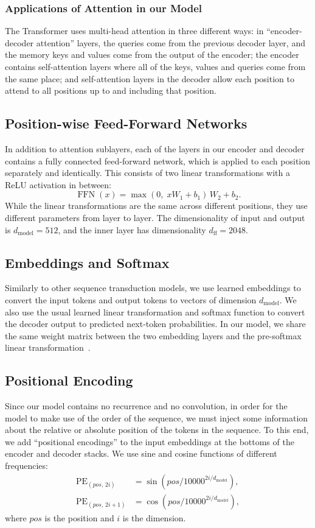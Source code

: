 \documentclass[10pt,letterpaper]{article}
\DeclareMathOperator{\FFN}{FFN}
\DeclareMathOperator{\PE}{PE}
\newcommand{\dmodel}{d_{\mathrm{model}}}
\newcommand{\dff}{d_{\mathrm{ff}}}
\begin{document}
\subsubsection{Applications of Attention in our Model}
The Transformer uses multi-head attention in three different ways: in
``encoder-decoder attention'' layers, the queries come from the previous decoder
layer, and the memory keys and values come from the output of the encoder; the
encoder contains self-attention layers where all of the keys, values and queries
come from the same place; and self-attention layers in the decoder allow each
position to attend to all positions up to and including that position.

\subsection{Position-wise Feed-Forward Networks}
In addition to attention sublayers, each of the layers in our encoder and decoder
contains a fully connected feed-forward network, which is applied to each position
separately and identically. This consists of two linear transformations with a
ReLU activation in between:
\begin{equation}
  \FFN(x) = \max(0,\; xW_1 + b_1)\,W_2 + b_2 .
  \label{eq:ffn}
\end{equation}
While the linear transformations are the same across different positions, they use
different parameters from layer to layer. The dimensionality of input and output is
$\dmodel = 512$, and the inner layer has dimensionality $\dff = 2048$.

\subsection{Embeddings and Softmax}
Similarly to other sequence transduction models, we use learned embeddings to
convert the input tokens and output tokens to vectors of dimension $\dmodel$. We
also use the usual learned linear transformation and softmax function to convert
the decoder output to predicted next-token probabilities. In our model, we share
the same weight matrix between the two embedding layers and the pre-softmax linear
transformation~\citep{press2017using}.

\subsection{Positional Encoding}
Since our model contains no recurrence and no convolution, in order for the model to
make use of the order of the sequence, we must inject some information about the
relative or absolute position of the tokens in the sequence. To this end, we add
``positional encodings'' to the input embeddings at the bottoms of the encoder and
decoder stacks. We use sine and cosine functions of different frequencies:
\begin{align}
  \PE_{(pos,\,2i)}   &= \sin\!\left(pos / 10000^{2i/\dmodel}\right), \\
  \PE_{(pos,\,2i+1)} &= \cos\!\left(pos / 10000^{2i/\dmodel}\right),
\end{align}
where $pos$ is the position and $i$ is the dimension.
\end{document}
